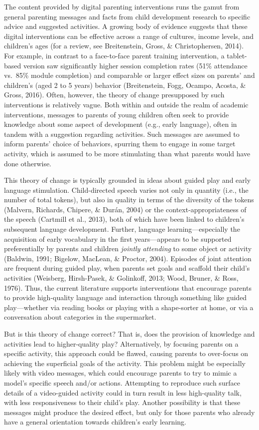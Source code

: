 \documentclass[
  english,
  man]{apa6}
\begin{document}
The content provided by digital parenting interventions runs the gamut from general parenting messages and facts from child development research to specific advice and suggested activities.
A growing body of evidence suggests that these digital interventions can be effective across a range of cultures, income levels, and children's ages (for a review, see Breitenstein, Gross, \& Christophersen, 2014).
For example, in contrast to a face-to-face parent training intervention, a tablet-based version saw significantly higher session completion rates (51\% attendance vs.~85\% module completion) and comparable or larger effect sizes on parents' and children's (aged 2 to 5 years) behavior (Breitenstein, Fogg, Ocampo, Acosta, \& Gross, 2016).
Often, however, the theory of change presupposed by such interventions is relatively vague.
Both within and outside the realm of academic interventions, messages to parents of young children often seek to provide knowledge about some aspect of development (e.g., early language), often in tandem with a suggestion regarding activities.
Such messages are assumed to inform parents' choice of behaviors, spurring them to engage in some target activity, which is assumed to be more stimulating than what parents would have done otherwise.

This theory of change is typically grounded in ideas about guided play and early language stimulation.
Child-directed speech varies not only in quantity (i.e., the number of total tokens), but also in quality in terms of the diversity of the tokens (Malvern, Richards, Chipere, \& Durán, 2004) or the context-appropriateness of the speech (Cartmill et al., 2013), both of which have been linked to children's subsequent language development.
Further, language learning---especially the acquisition of early vocabulary in the first years---appears to be supported preferentially by parents and children \emph{jointly attending} to some object or activity (Baldwin, 1991; Bigelow, MacLean, \& Proctor, 2004).
Episodes of joint attention are frequent during guided play, when parents set goals and scaffold their child's activities (Weisberg, Hirsh-Pasek, \& Golinkoff, 2013; Wood, Bruner, \& Ross, 1976).
Thus, the current literature supports interventions that encourage parents to provide high-quality language and interaction through something like guided play---whether via reading books or playing with a shape-sorter at home, or via a conversation about categories in the supermarket.

But is this theory of change correct? That is, does the provision of knowledge and activities lead to higher-quality play?
Alternatively, by focusing parents on a specific activity, this approach could be flawed, causing parents to over-focus on achieving the superficial goals of the activity.
This problem might be especially likely with video messages, which could encourage parents to try to mimic a model's specific speech and/or actions.
Attempting to reproduce such surface details of a video-guided activity could in turn result in less high-quality talk, with less responsiveness to their child's play.
Another possibility is that these messages might produce the desired effect, but only for those parents who already have a general orientation towards children's early learning.
\end{document}
